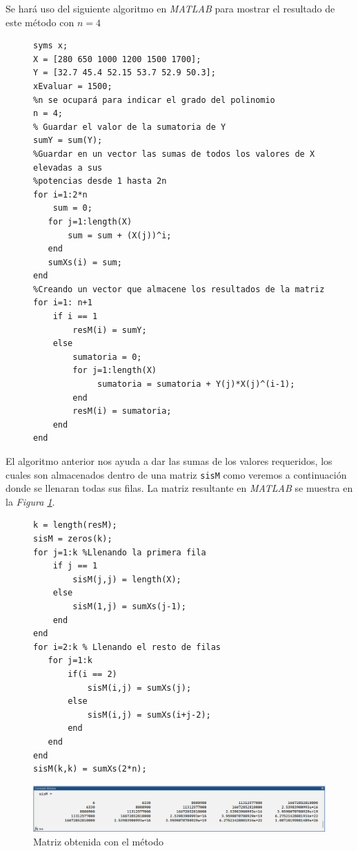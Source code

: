 \documentclass[11pt,letterpaper]{article}
\begin{document}
Se hará uso del siguiente algoritmo en \textit{MATLAB} para mostrar el resultado de este método con $n=4$
\begin{figure}[H]
\begin{tcolorbox}[title=Ejemplo 2: Implementación en MATLAB]
\begin{verbatim}
syms x;
X = [280 650 1000 1200 1500 1700];
Y = [32.7 45.4 52.15 53.7 52.9 50.3];
xEvaluar = 1500;
%n se ocupará para indicar el grado del polinomio
n = 4;
% Guardar el valor de la sumatoria de Y
sumY = sum(Y);
%Guardar en un vector las sumas de todos los valores de X elevadas a sus
%potencias desde 1 hasta 2n 
for i=1:2*n
    sum = 0;
   for j=1:length(X)
       sum = sum + (X(j))^i;
   end
   sumXs(i) = sum;
end
%Creando un vector que almacene los resultados de la matriz
for i=1: n+1
    if i == 1
        resM(i) = sumY; 
    else
        sumatoria = 0;
        for j=1:length(X)
             sumatoria = sumatoria + Y(j)*X(j)^(i-1);
        end
        resM(i) = sumatoria;
    end
end
\end{verbatim}
\end{tcolorbox}
\end{figure}
El algoritmo anterior nos ayuda a dar las sumas de los valores requeridos, los cuales son almacenados dentro de una matriz \texttt{sisM} como veremos a continuación donde se llenaran todas sus filas. La matriz resultante en \textit{MATLAB }se muestra en la \textit{Figura \ref{figure:sisM}}.

\begin{figure}[H]
\begin{tcolorbox}[title=Ejemplo 2: Implementación en MATLAB]
\begin{verbatim}
k = length(resM);
sisM = zeros(k);
for j=1:k %Llenando la primera fila
    if j == 1
        sisM(j,j) = length(X);
    else
        sisM(1,j) = sumXs(j-1);
    end
end
for i=2:k % Llenando el resto de filas
   for j=1:k
       if(i == 2)
           sisM(i,j) = sumXs(j);
       else
           sisM(i,j) = sumXs(i+j-2);
       end
   end
end
sisM(k,k) = sumXs(2*n);
\end{verbatim}
\end{tcolorbox}
\end{figure}

\begin{figure}[H]
\centering
\includegraphics[width=6in]{sisM.png}
\caption{Matriz obtenida con el método}
\label{figure:sisM}
\end{figure}
\end{document}
